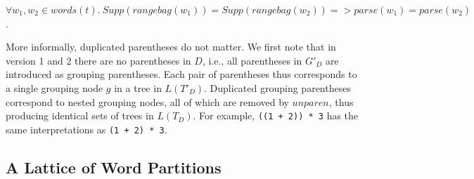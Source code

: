 \documentclass[acmsmall,review,anonymous]{acmart}\settopmatter{printfolios=true,printccs=false,printacmref=false}
\newcommand{\support}{\mathit{Supp}}
\newcommand{\semantic}{\mathit{unparen}} %
\newcommand{\parse}{\mathit{parse}} %
\newcommand{\words}{\mathit{words}} %
\newcommand{\alt}{\mathit{alt}} %
\newcommand{\rangebag}{\mathit{rangebag}} %
\begin{document}
\begin{lemma}
  $\forall w_1, w_2 \in \words(t).\ \support(\rangebag(w_1)) = \support(\rangebag(w_2)) => \parse(w_1) = \parse(w_2)$.
  \label{lemma:rangeset-equality}
\end{lemma}
\noindent More informally, duplicated parentheses do not matter. We first note that in version 1 and 2 there are no parentheses in $D$, i.e., all parentheses in $G'_D$ are introduced as grouping parentheses. Each pair of parentheses thus corresponds to a single grouping node $g$ in a tree in $L(T'_D)$. Duplicated grouping parentheses correspond to nested grouping nodes, all of which are removed by $\semantic$, thus producing identical sets of trees in $L(T_D)$. For example, \verb|((1 + 2)) * 3| has the same interpretations as \verb|(1 + 2) * 3|.

\subsection{A Lattice of Word Partitions} \label{sec:lattice}
\end{document}
